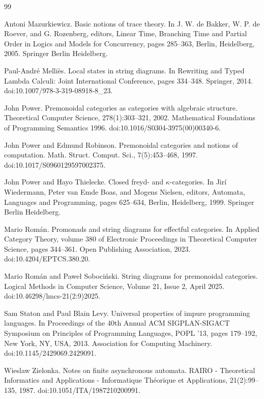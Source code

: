 \documentclass[10pt,a4paper]{article}
\begin{document}
\begin{thebibliography}{99}
\par\noindent    Antoni Mazurkiewicz.  Basic notions of trace theory.  In J. W. de Bakker, W. P. de Roever, and G. Rozenberg, editors, Linear Time, Branching Time and Partial Order in Logics and Models for Concurrency, pages 285--363, Berlin, Heidelberg, 2005. Springer Berlin Heidelberg.  

\par\noindent    Paul-André Melliès.  Local states in string diagrams.  In Rewriting and Typed Lambda Calculi: Joint International Conference, pages 334--348. Springer, 2014.  doi:10.1007/978-3-319-08918-8\_23.  

\par\noindent    John Power.  Premonoidal categories as categories with algebraic structure.  Theoretical Computer Science, 278(1):303--321, 2002.  Mathematical Foundations of Programming Semantics 1996.  doi:10.1016/S0304-3975(00)00340-6.  

\par\noindent    John Power and Edmund Robinson.  Premonoidal categories and notions of computation.  Math. Struct. Comput. Sci., 7(5):453--468, 1997.  doi:10.1017/S0960129597002375.  

\par\noindent    John Power and Hayo Thielecke.  Closed freyd- and $\kappa$-categories.  In Jirí Wiedermann, Peter van Emde Boas, and Mogens Nielsen, editors, Automata, Languages and Programming, pages 625--634, Berlin, Heidelberg, 1999. Springer Berlin Heidelberg.  

\par\noindent    Mario Román.  Promonads and string diagrams for effectful categories.  In Applied Category Theory, volume 380 of Electronic Proceedings in Theoretical Computer Science, pages 344--361. Open Publishing Association, 2023.  doi:10.4204/EPTCS.380.20.  

\par\noindent    Mario Román and Paweł Sobociński.  String diagrams for premonoidal categories.  Logical Methods in Computer Science, Volume 21, Issue 2, April 2025.  doi:10.46298/lmcs-21(2:9)2025.  

\par\noindent    Sam Staton and Paul Blain Levy.  Universal properties of impure programming languages.  In Proceedings of the 40th Annual ACM SIGPLAN-SIGACT Symposium on Principles of Programming Languages, POPL ’13, pages 179--192, New York, NY, USA, 2013. Association for Computing Machinery.  doi:10.1145/2429069.2429091.  

\par\noindent    Wieslaw Zielonka.  Notes on finite asynchronous automata.  RAIRO - Theoretical Informatics and Applications - Informatique Théorique et Applications, 21(2):99--135, 1987.  doi:10.1051/ITA/1987210200991.  

\end{thebibliography}
\end{document}
